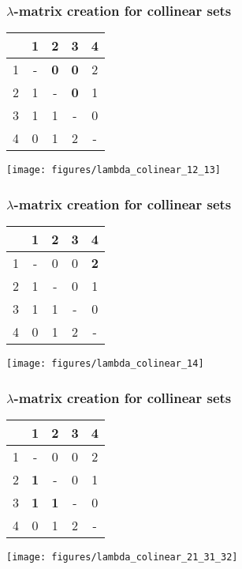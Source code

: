 \documentclass{beamer}
\begin{document}
\begin{frame}
\frametitle{$\lambda$-matrix creation for collinear sets}
\begin{tabular}{| c || c | c | c | c |}
    & 1 & 2 & 3 & 4 \\
 \hline
  1 & - & \textbf{0} & \textbf{0} & 2 \\
  2 & 1 & - & \textbf{0} & 1 \\
  3 & 1 & 1 & - & 0 \\
  4 & 0 & 1 & 2 & - \\
\end{tabular}
\begin{minipage}{0.5\textwidth}
\texttt{[image: figures/lambda\_colinear\_12\_13]}
\end{minipage}
\end{frame}

\begin{frame}
\frametitle{$\lambda$-matrix creation for collinear sets}
\begin{tabular}{| c || c | c | c | c |}
    & 1 & 2 & 3 & 4 \\
 \hline
  1 & - & 0 & 0 & \textbf{2} \\
  2 & 1 & - & 0 & 1 \\
  3 & 1 & 1 & - & 0 \\
  4 & 0 & 1 & 2 & - \\
\end{tabular}
\begin{minipage}{0.5\textwidth}
\texttt{[image: figures/lambda\_colinear\_14]}
\end{minipage}
\end{frame}

\begin{frame}
\frametitle{$\lambda$-matrix creation for collinear sets}
\begin{tabular}{| c || c | c | c | c |}
    & 1 & 2 & 3 & 4 \\
 \hline
  1 & - & 0 & 0 & 2 \\
  2 & \textbf{1} & - & 0 & 1 \\
  3 & \textbf{1} & \textbf{1} & - & 0 \\
  4 & 0 & 1 & 2 & - \\
\end{tabular}
\begin{minipage}{0.5\textwidth}
\texttt{[image: figures/lambda\_colinear\_21\_31\_32]}
\end{minipage}
\end{frame}
\end{document}
